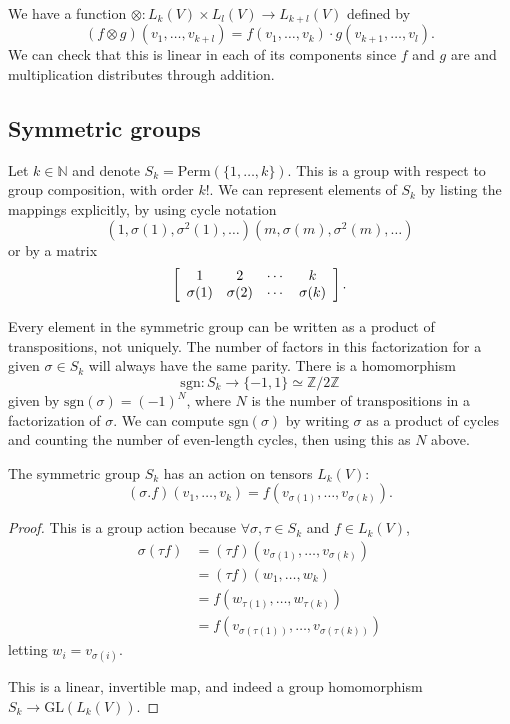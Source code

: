 \begin{defn}
We have a function
$\otimes : L_k (V) \times L_l(V) \to L_{k + l}(V)$ defined by
$$
  (f \otimes g)
    (v_1, \dots, v_{k+l})
= f(v_1, \dots, v_k) \cdot g(v_{k+1}, \dots, v_l).
$$
We can check that this is linear in each of its components since $f$
and $g$ are and multiplication distributes through addition.
\end{defn}

\subsection{Symmetric groups}
Let $k \in \mathbb{N}$ and denote
$S_k = \mathrm{Perm}(\{1, \dots, k\})$. This is a group with respect
to group composition, with order $k!$. We can represent elements of
$S_k$ by listing the mappings explicitly, by using cycle notation
$$
(1, \sigma(1), \sigma^2(1), \dots)(m, \sigma(m), \sigma^2(m), \dots)
$$
or by a matrix
$$
\left[
  \begin{array}{c c c c}
    1         & 2         & \cdots & k \\
    \sigma(1) & \sigma(2) & \cdots & \sigma(k)
  \end{array}
\right].
$$

Every element in the symmetric group can be written as a product of
transpositions, not uniquely. The number of factors in this
factorization for a given $\sigma \in S_k$ will always have the same
parity. There is a homomorphism
$$
       \mathrm{sgn} : S_k
\to    \{-1, 1\}
\simeq \mathbb{Z} / 2\mathbb{Z}
$$
given by $\mathrm{sgn}(\sigma) = (-1)^{N}$, where $N$ is the number of
transpositions in a factorization of $\sigma$. We can compute
$\mathrm{sgn}(\sigma)$ by writing $\sigma$ as a product of cycles and
counting the number of even-length cycles, then using this as $N$
above.

\begin{lemma}
The symmetric group $S_k$ has an action on tensors $L_k(V)$:
$$
  (\sigma . f)(v_1, \dots, v_k)
= f(v_{\sigma(1)}, \dots, v_{\sigma(k)}).
$$
\end{lemma}
\begin{proof}
This is a group action because $\forall \sigma, \tau \in S_k$ and
$f \in L_k(V)$,
\begin{align*}
   \sigma (\tau f)
&= (\tau f)(v_{\sigma(1)}, \dots, v_{\sigma(k)}) \\
&= (\tau f)(w_1, \dots, w_k) \\
&= f(w_{\tau(1)}, \dots, w_{\tau(k)}) \\
&= f(v_{\sigma(\tau(1))}, \dots, v_{\sigma(\tau(k))})
\end{align*}
letting $w_i = v_{\sigma(i)}$.

This is a linear, invertible map, and indeed a group homomorphism
$S_k \to \mathrm{GL}(L_k(V))$.
\end{proof}

